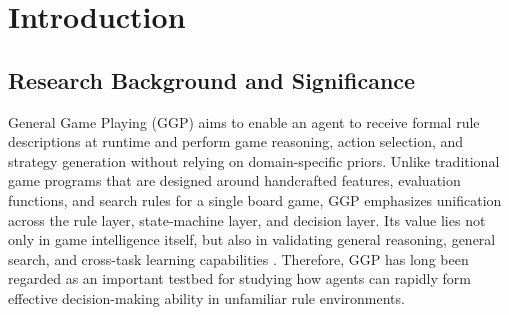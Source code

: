 ﻿%


\chapter{Introduction}


\section{Research Background and Significance}


General Game Playing (GGP) aims to enable an agent to receive formal rule descriptions at runtime and perform game reasoning, action selection, and strategy generation without relying on domain-specific priors. Unlike traditional game programs that are designed around handcrafted features, evaluation functions, and search rules for a single board game, GGP emphasizes unification across the rule layer, state-machine layer, and decision layer. Its value lies not only in game intelligence itself, but also in validating general reasoning, general search, and cross-task learning capabilities \cite{genesereth2005general,genesereth2026general}. Therefore, GGP has long been regarded as an important testbed for studying how agents can rapidly form effective decision-making ability in unfamiliar rule environments.


